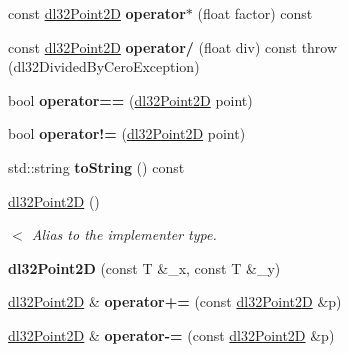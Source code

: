 \begin{DoxyCompactItemize}
\item 
\hypertarget{structdl32_point2_d_a6a90c787967046022299b2a3f36a011b}{const \hyperlink{structdl32_point2_d}{dl32\-Point2\-D} {\bfseries operator$\ast$} (float factor) const }\label{structdl32_point2_d_a6a90c787967046022299b2a3f36a011b}

\item 
\hypertarget{structdl32_point2_d_ad1faeb957f5310f928087cc69771b429}{const \hyperlink{structdl32_point2_d}{dl32\-Point2\-D} {\bfseries operator/} (float div) const   throw (dl32\-Divided\-By\-Cero\-Exception)}\label{structdl32_point2_d_ad1faeb957f5310f928087cc69771b429}

\item 
\hypertarget{structdl32_point2_d_ab23cfad956f23c869bbbb494afa6cf83}{bool {\bfseries operator==} (\hyperlink{structdl32_point2_d}{dl32\-Point2\-D} point)}\label{structdl32_point2_d_ab23cfad956f23c869bbbb494afa6cf83}

\item 
\hypertarget{structdl32_point2_d_a1d0982c5afee0994378e59e42205c085}{bool {\bfseries operator!=} (\hyperlink{structdl32_point2_d}{dl32\-Point2\-D} point)}\label{structdl32_point2_d_a1d0982c5afee0994378e59e42205c085}

\item 
\hypertarget{structdl32_point2_d_a082f9c45bebc9987c3ea1462b6c36bd6}{std\-::string {\bfseries to\-String} () const }\label{structdl32_point2_d_a082f9c45bebc9987c3ea1462b6c36bd6}

\item 
\hyperlink{structdl32_point2_d_a085f1fc861a7cda81bc9c9841ddb3fcb}{dl32\-Point2\-D} ()
\begin{DoxyCompactList}\small\item\em $<$ Alias to the implementer type. \end{DoxyCompactList}\item 
\hypertarget{structdl32_point2_d_ac2aba4f675fecec71bbdded7a3e396b5}{{\bfseries dl32\-Point2\-D} (const T \&\-\_\-x, const T \&\-\_\-y)}\label{structdl32_point2_d_ac2aba4f675fecec71bbdded7a3e396b5}

\item 
\hypertarget{structdl32_point2_d_a6dff31a66233cf228ea28d8661650049}{\hyperlink{structdl32_point2_d}{dl32\-Point2\-D} \& {\bfseries operator+=} (const \hyperlink{structdl32_point2_d}{dl32\-Point2\-D} \&p)}\label{structdl32_point2_d_a6dff31a66233cf228ea28d8661650049}

\item 
\hypertarget{structdl32_point2_d_a4067731c4c15e1cabdafb3378f5495c1}{\hyperlink{structdl32_point2_d}{dl32\-Point2\-D} \& {\bfseries operator-\/=} (const \hyperlink{structdl32_point2_d}{dl32\-Point2\-D} \&p)}\label{structdl32_point2_d_a4067731c4c15e1cabdafb3378f5495c1}

\end{DoxyCompactItemize}
